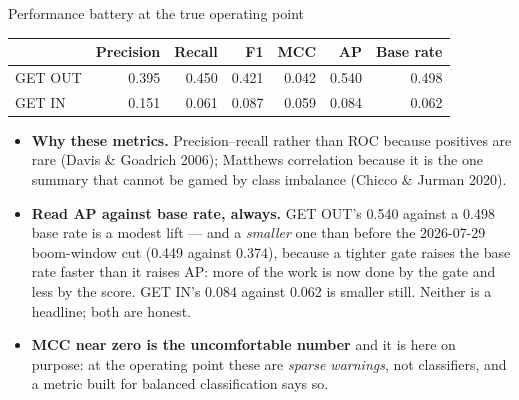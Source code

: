 \documentclass[aspectratio=169,11pt]{beamer}
\begin{document}
\begin{frame}{Performance battery at the true operating point}
  \small
  \begin{table}
    \begin{tabular}{@{}lrrrrrr@{}}
      \toprule
      & \textbf{Precision} & \textbf{Recall} & \textbf{F1} & \textbf{MCC}
      & \textbf{AP} & \textbf{Base rate} \\
      \midrule
      GET OUT & 0.395 & 0.450 & 0.421 & 0.042 & 0.540 & 0.498 \\
      GET IN  & 0.151 & 0.061 & 0.087 & 0.059 & 0.084 & 0.062 \\
      \bottomrule
    \end{tabular}
  \end{table}
  \vspace{0.4em}
  \begin{itemize}\footnotesize
    \item \textbf{Why these metrics.} Precision--recall rather than ROC
      because positives are rare (Davis \& Goadrich 2006); Matthews
      correlation because it is the one summary that cannot be gamed by class
      imbalance (Chicco \& Jurman 2020).
    \item \textbf{Read AP against base rate, always.} GET OUT's 0.540 against
      a 0.498 base rate is a modest lift --- and a \emph{smaller} one than
      before the 2026-07-29 boom-window cut (0.449 against 0.374), because a
      tighter gate raises the base rate faster than it raises AP: more of the
      work is now done by the gate and less by the score. GET IN's 0.084
      against 0.062 is smaller still. Neither is a headline; both are honest.
    \item \textbf{MCC near zero is the uncomfortable number} and it is here on
      purpose: at the operating point these are \emph{sparse warnings}, not
      classifiers, and a metric built for balanced classification says so.
  \end{itemize}
\end{frame}

\end{document}
